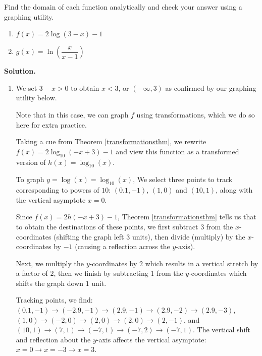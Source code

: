 \documentclass{ximera}
\begin{document}
\begin{example}  Find the domain of each function analytically and check your answer using a graphing utility.


\begin{enumerate}
\item  $f(x) = 2\log(3-x)-1$ 

\item  $g(x) = \ln \left(\dfrac{x}{x-1}\right)$
\end{enumerate}

{\bf Solution.}

\begin{enumerate}

\item  We set $3-x > 0$ to obtain $x<3$, or $(-\infty, 3)$ as confirmed by our graphing utility below.

\begin{center}
\end{center}

Note that in this case, we can graph $f$ using transformations, which we do so here for extra practice. 

 


Taking a cue from Theorem \ref{transformationsthm}, we rewrite $f(x) = 2 \log_{10}(-x+3) -1$ and  view this function as a transformed version of $h(x) = \log_{10}(x)$. 



 

To graph $y = \log(x) = \log_{10}(x)$,  We select three points to track corresponding to powers of $10$:  $(0.1, -1)$, $(1,0)$ and $(10,1)$, along with the vertical asymptote $x=0$.   


 

Since $f(x) = 2h(-x+3)-1$, Theorem \ref{transformationsthm} tells us that to obtain the destinations of these points, we first subtract $3$ from the $x$-coordinates (shifting the graph left $3$ units), then divide (multiply) by the $x$-coordinates by $-1$ (causing a reflection across the $y$-axis).   


 

Next, we multiply the $y$-coordinates by $2$ which results in a vertical stretch by a factor of $2$, then we finish by subtracting $1$ from the $y$-coordinates which shifts the graph down $1$ unit.  


 

Tracking points, we find:   $(0.1, -1) \rightarrow  (-2.9, -1) \rightarrow (2.9, -1) \rightarrow (2.9, -2) \rightarrow (2.9, -3)$, $(1,0) \rightarrow (-2,0) \rightarrow (2,0) \rightarrow (2,0) \rightarrow (2,-1)$, and  $(10,1) \rightarrow (7,1) \rightarrow (-7,1) \rightarrow (-7,2) \rightarrow (-7,1)$.  The vertical shift and reflection about the $y$-axis affects the vertical asymptote:  $x = 0 \rightarrow x = -3 \rightarrow x = 3$.  



\end{enumerate}
\end{example}
\end{document}
